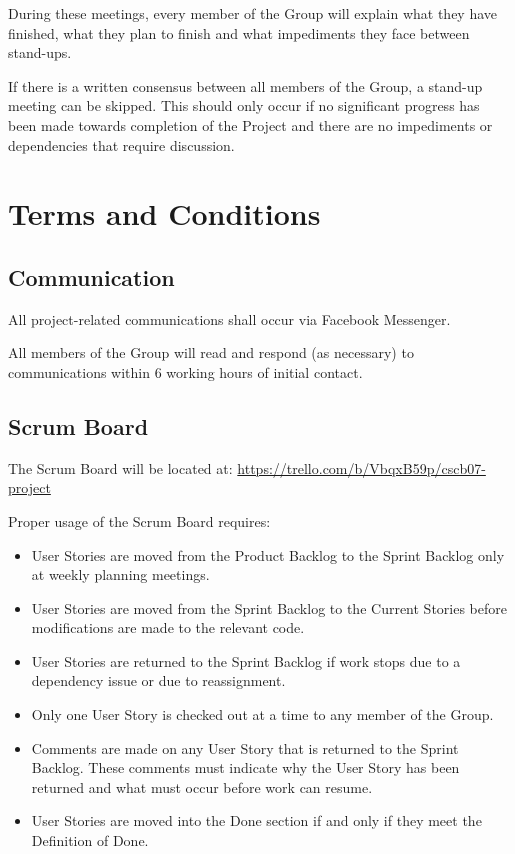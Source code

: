 \documentclass[a4paper,12pt]{article} %
\begin{document}
During these meetings, every member of the Group will explain what they have finished, what they plan to finish and what impediments they face between stand-ups. 

If there is a written consensus between all members of the Group, a stand-up meeting can be skipped. This should only occur if no significant progress has been made towards completion of the Project and there are no impediments or dependencies that require discussion.



\section{Terms and Conditions}

\subsection{Communication}

All project-related communications shall occur via Facebook Messenger.

All members of the Group will read and respond (as necessary) to communications within 6 working hours of initial contact.

\subsection{Scrum Board}

The Scrum Board will be located at: 
\url{https://trello.com/b/VbqxB59p/cscb07-project}

Proper usage of the Scrum Board requires:
\begin{itemize}
	\item User Stories are moved from the Product Backlog to the Sprint Backlog only at weekly planning meetings.
	\item User Stories are moved from the Sprint Backlog to the Current Stories before modifications are made to the relevant code.
	\item User Stories are returned to the Sprint Backlog if work stops due to a dependency issue or due to reassignment.
	\item Only one User Story is checked out at a time to any member of the Group.
	\item Comments are made on any User Story that is returned to the Sprint Backlog. These comments must indicate why the User Story has been returned and what must occur before work can resume.
	\item User Stories are moved into the Done section if and only if they meet the Definition of Done.
\end{itemize}
\end{document}
